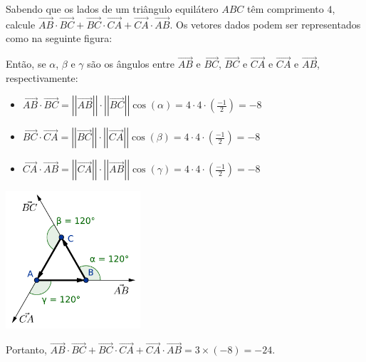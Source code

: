 \documentclass[12pt,a4paper]{article}
\newcommand{\vect}[1]{\overrightarrow{#1}}
\newcommand{\norm}[1]{\left|\left|{#1}\right|\right|}
\begin{document}
\begin{ExerciseList}
\Exercise[title={2,5}] Sabendo que os lados de um triângulo equilátero $ABC$ têm comprimento $4$, calcule $\vect{AB}\cdot\vect{BC} + \vect{BC}\cdot\vect{CA} + \vect{CA}\cdot\vect{AB}$.
\Answer Os vetores dados podem ser representados como na seguinte figura:

\parbox{.7\linewidth}{%
Então, se $\alpha$, $\beta$ e $\gamma$ são os ângulos entre $\vect{AB}$ e $\vect{BC}$, $\vect{BC}$ e $\vect{CA}$ e $\vect{CA}$ e $\vect{AB}$, respectivamente:
\begin{itemize}
\item $\vect{AB}\cdot\vect{BC}
= \norm{ \vect{AB} } \cdot \norm{ \vect{BC} } \cos( \alpha)
= 4 \cdot 4 \cdot\left( \frac{-1}{2} \right) = -8$
\item $\vect{BC}\cdot\vect{CA}
= \norm{ \vect{BC} } \cdot \norm{ \vect{CA} } \cos( \beta)
= 4 \cdot 4 \cdot\left( \frac{-1}{2} \right) = -8$
\item $\vect{CA}\cdot\vect{AB}
= \norm{ \vect{CA} } \cdot \norm{ \vect{AB} } \cos( \gamma)
= 4 \cdot 4 \cdot\left( \frac{-1}{2} \right) = -8$
\end{itemize}
}
\parbox{.2\linewidth}{%
\includegraphics[width=5.0cm]{img/prova-1-pro-tri-equi}
}

Portanto, $\vect{AB}\cdot\vect{BC} + \vect{BC}\cdot\vect{CA} + \vect{CA}\cdot\vect{AB} = 3 \times (-8) = -24$.


\end{ExerciseList}
\end{document}
